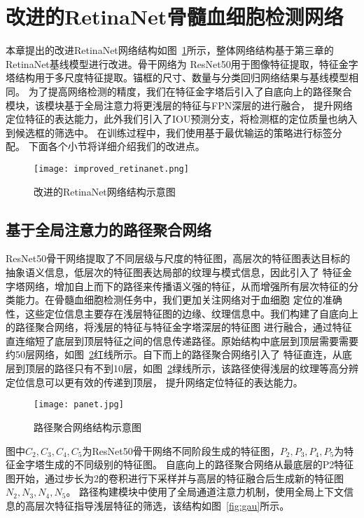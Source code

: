 \section{改进的RetinaNet骨髓血细胞检测网络}
本章提出的改进RetinaNet网络结构如图~\ref{fig:improved_retinanet}所示，整体网络结构基于第三章的RetinaNet基线模型进行改进。骨干网络为
ResNet50用于图像特征提取，特征金字塔结构用于多尺度特征提取。锚框的尺寸、数量与分类回归网络结果与基线模型相同。
为了提高网络检测的精度，我们在特征金字塔后引入了自底向上的路径聚合模块，该模块基于全局注意力将更浅层的特征与FPN深层的进行融合，
提升网络定位特征的表达能力，此外我们引入了IOU预测分支，将检测框的定位质量也纳入到候选框的筛选中。
在训练过程中，我们使用基于最优输运的策略进行标签分配。
下面各个小节将详细介绍我们的改进点。
\begin{figure}[htbp]                     
  \centering                      
  \texttt{[image: improved\_retinanet.png]}                      
  \caption{改进的RetinaNet网络结构示意图}                      
  \label{fig:improved_retinanet}       
\end{figure}  

\subsection{基于全局注意力的路径聚合网络}
ResNet50骨干网络提取了不同层级与尺度的特征图，高层次的特征图表达目标的抽象语义信息，低层次的特征图表达局部的纹理与模式信息，因此引入了
特征金字塔网络，增加自上而下的路径来传播语义强的特征，从而增强所有层次特征的分类能力。在骨髓血细胞检测任务中，我们更加关注网络对于血细胞
定位的准确性，这些定位信息主要存在浅层特征图的边缘、纹理信息中。我们构建了自底向上的路径聚合网络，将浅层的特征与特征金字塔深层的特征图
进行融合，通过特征直连缩短了底层到顶层特征之间的信息传递路径。原始结构中底层到顶层需要需要约50层网络，如图~\ref{fig:panet}红线所示。自下而上的路径聚合网络引入了
特征直连，从底层到顶层的路径只有不到10层，如图~\ref{fig:panet}绿线所示，该路径使得浅层的纹理等高分辨定位信息可以更有效的传递到顶层，
提升网络定位特征的表达能力。
\begin{figure}[htbp]                     
  \centering                      
  \texttt{[image: panet.jpg]}                      
  \caption{路径聚合网络结构示意图}                      
  \label{fig:panet}       
\end{figure}  

图中${C_2, C_3, C_4, C_5}$为ResNet50骨干网络不同阶段生成的特征图，${P_2, P_3, P_4, P_5}$为特征金字塔生成的不同级别的特征图。
自底向上的路径聚合网络从最底层的P2特征图开始，通过步长为2的卷积进行下采样并与高层的特征融合后生成新的特征图${N_2, N_3, N_4, N_5}$。
路径构建模块中使用了全局通道注意力机制\cite{li2018pyramid}，使用全局上下文信息的高层次特征指导浅层特征的筛选，该结构如图~\ref{fig:gau}所示。

